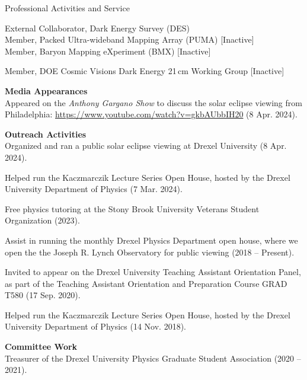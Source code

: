 \documentclass{resume} %
\begin{document}


\begin{rSection}{Professional Activities and Service}

\begin{description}[leftmargin=10em, style=nextline]

\item[Collaborations] External Collaborator, Dark Energy Survey (DES)\\
  Member, Packed Ultra-wideband Mapping Array (PUMA) [Inactive]\\
  Member, Baryon Mapping eXperiment (BMX) [Inactive]

\item[Working Groups] Member, DOE Cosmic Visions Dark Energy 21$\,$cm Working Group [Inactive]


\end{description}
\textbf{Media Appearances}\\
Appeared on the \textit{Anthony Gargano Show} to discuss the solar eclipse viewing from Philadelphia: \href{https://www.youtube.com/watch?v=gkbAUbbIH20}{https://www.youtube.com/watch?v=gkbAUbbIH20} (8 Apr. 2024).

\textbf{Outreach Activities}\\
Organized and ran a public solar eclipse viewing at Drexel University (8 Apr. 2024).

Helped run the Kaczmarczik Lecture Series Open House, hosted by the Drexel University Department of Physics (7 Mar. 2024).

Free physics tutoring at the Stony Brook University Veterans Student Organization (2023).

Assist in running the monthly Drexel Physics Department open house, where we open the the Joseph R. Lynch Observatory for public viewing (2018 -- Present).

Invited to appear on the Drexel University Teaching Assistant Orientation Panel, as part of the Teaching Assistant Orientation and Preparation Course GRAD T580 (17 Sep. 2020).

Helped run the Kaczmarczik Lecture Series Open House, hosted by the Drexel University Department of Physics (14 Nov. 2018).

\textbf{Committee Work}\\
Treasurer of the Drexel University Physics Graduate Student Association (2020 -- 2021).

\end{rSection}
\end{document}
